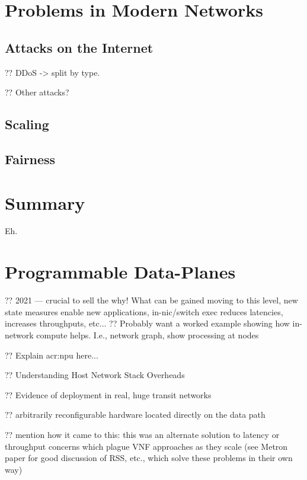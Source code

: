 \section{Problems in Modern Networks}\label{sec:problems-in-modern-networks}

\subsection{Attacks on the Internet}

?? DDoS -> split by type.

?? Other attacks?

\subsection{Scaling}

\subsection{Fairness}

\section{Summary}
Eh.


\section{Programmable Data-Planes}

?? 2021 --- crucial to sell the why! What can be gained moving to this level, new state measures enable new applications, in-nic/switch exec reduces latencies, increases throughputs, etc...
?? Probably want a worked example showing how in-network compute helps. I.e., network graph, show processing at nodes

?? Explain \gls{acr:npu} here...

?? Understanding Host Network Stack Overheads~\parencite{DBLP:conf/sigcomm/CaiCVH021}

?? Evidence of deployment in real, huge transit networks~

?? arbitrarily reconfigurable hardware located directly on the data path

?? mention how it came to this: this was an alternate solution to latency or throughput concerns which plague VNF approaches as they scale (see Metron paper for good discussion of RSS, etc., which solve these problems in their own way)


